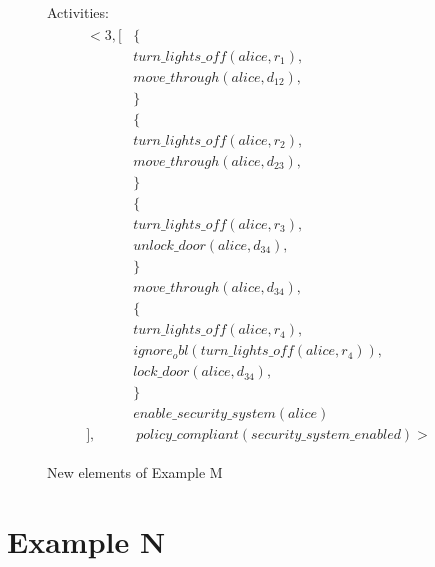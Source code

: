 \begin{figure}[H]
    \begin{framed}
        Activities:
        \begin{gather}
        \begin{split}
            <3, [
                & \{ \\
                    & turn\_lights\_off(alice, r_1), \\
                    & move\_through(alice, d_{12}), \\
                & \} \\
                & \{ \\
                    & turn\_lights\_off(alice, r_{2}), \\
                    & move\_through(alice, d_{23}), \\
                & \} \\
                & \{ \\
                    & turn\_lights\_off(alice, r_{3}), \\
                    & unlock\_door(alice, d_{34}), \\
                & \} \\
                & move\_through(alice, d_{34}), \\
                & \{ \\
                    & turn\_lights\_off(alice, r_{4}), \\
                    & ignore_obl(turn\_lights\_off(alice, r_{4})), \\
                    & lock\_door(alice, d_{34}), \\
                & \} \\
                & enable\_security\_system(alice) \\
            ], & \ policy\_compliant(security\_system\_enabled)>
        \end{split}
        \end{gather}
    \end{framed}
    \caption{New elements of Example M}
    \label{fig:apia_example_m_description}
\end{figure}

\section{Example N}

